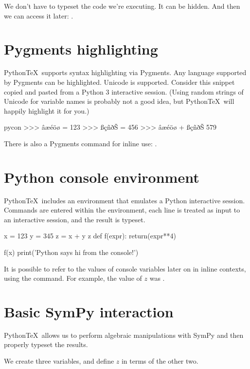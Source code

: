 \documentclass[11pt]{article}
\newcommand{\pytex}{Python\TeX}
\begin{document}
We don't have to typeset the code we're executing.  It can be hidden. And then we can access it later:  .


\section{Pygments highlighting}

\pytex\ supports syntax highlighting via Pygments.  Any language supported by Pygments can be highlighted.  Unicode is supported.  Consider this snippet copied and pasted from a Python 3 interactive session.  (Using random strings of Unicode for variable names is probably not a good idea, but \pytex\ will happily highlight it for you.)

\begin{pygments}{pycon}
>>> âæéöø = 123
>>> ßçñðŠ = 456
>>> âæéöø + ßçñðŠ
579
\end{pygments}

There is also a Pygments command for inline use:  .


\section{Python console environment}

\pytex\ includes an environment that emulates a Python interactive session.  Commands are entered within the environment, each line is treated as input to an interactive session, and the result is typeset.

\begin{pyconsole}[][frame=single]
x = 123
y = 345
z = x + y
z
def f(expr):
    return(expr**4)

f(x)
print('Python says hi from the console!')
\end{pyconsole}

It is possible to refer to the values of console variables later on in inline contexts, using the  command.  For example, the value of $z$ was .


\section{Basic SymPy interaction}

\pytex\ allows us to perform algebraic manipulations with SymPy and then properly typeset the results.

We create three variables, and define $z$ in terms of the other two.
\end{document}
